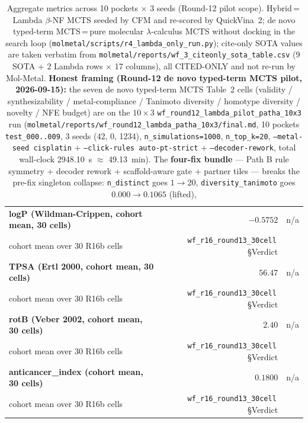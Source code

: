 \begin{table}[ht]
\begin{tabular}{lrrr}
\textbf{logP (Wildman-Crippen, cohort mean, 30 cells)} & \DESIGN{} & $\mathbf{-0.5752}$ \MEASURED{} & n/a \\
\quad\quad cohort mean over 30 R16b cells & & \texttt{wf\_r16\_round13\_30cell}\,\S Verdict & \\
\textbf{TPSA (Ertl 2000, cohort mean, 30 cells)} & \DESIGN{} & $\mathbf{56.47}$ \MEASURED{} & n/a \\
\quad\quad cohort mean over 30 R16b cells & & \texttt{wf\_r16\_round13\_30cell}\,\S Verdict & \\
\textbf{rotB (Veber 2002, cohort mean, 30 cells)} & \DESIGN{} & $\mathbf{2.40}$ \MEASURED{} & n/a \\
\quad\quad cohort mean over 30 R16b cells & & \texttt{wf\_r16\_round13\_30cell}\,\S Verdict & \\
\textbf{anticancer\_index (cohort mean, 30 cells)} & \DESIGN{} & $\mathbf{0.1800}$ \MEASURED{} & n/a \\
\quad\quad cohort mean over 30 R16b cells & & \texttt{wf\_r16\_round13\_30cell}\,\S Verdict & \\
\bottomrule
\end{tabular}
\caption{Aggregate metrics across 10 pockets $\times$ 3 seeds
(Round-12 pilot scope). Hybrid\,=\,Lambda $\beta$-NF MCTS seeded by
CFM and re-scored by QuickVina~2; de novo typed-term MCTS\,=\,pure molecular
$\lambda$-calculus MCTS without docking in the search loop
(\texttt{molmetal/scripts/r4\_lambda\_only\_run.py}); cite-only
SOTA values are taken verbatim from
\texttt{molmetal/reports/wf\_3\_citeonly\_sota\_table.csv} (9
SOTA + 2 Lambda rows $\times$ 17 columns), all CITED-ONLY and
not re-run by Mol-Metal. \textbf{Honest framing (Round-12
de novo typed-term MCTS pilot, 2026-09-15):} the seven de novo typed-term MCTS
Table~2 cells (validity / synthesizability / metal-compliance /
Tanimoto diversity / homotype diversity / novelty / NFE budget) are
\MEASURED{} on the $10{\times}3$
\texttt{wf\_round12\_lambda\_pilot\_patha\_10x3} run
(\texttt{molmetal/reports/wf\_round12\_lambda\_patha\_10x3/final.md},
10 pockets \texttt{test\_000..009}, 3 seeds (42, 0, 1234),
\texttt{n\_simulations=1000}, \texttt{n\_top\_k=20},
\texttt{--metal-seed cisplatin} + \texttt{--click-rules auto-pt-strict}
+ \texttt{--decoder-rework}, total wall-clock 2948.10~s $\approx$
49.13~min). The \textbf{four-fix bundle} --- Path B rule symmetry +
decoder rework + scaffold-aware gate + partner tiles --- breaks the
pre-fix singleton collapse: \texttt{n\_distinct} goes $1 \to 20$,
\texttt{diversity\_tanimoto} goes $0.000 \to 0.1065$ (lifted),
}
\end{table}
